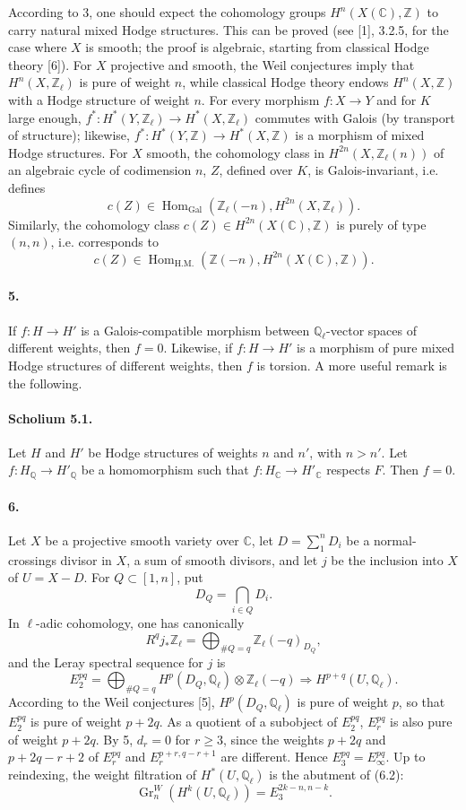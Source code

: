\documentclass[10pt]{article}
\newcommand{\C}{\mathbb C}
\newcommand{\Q}{\mathbb Q}
\newcommand{\Z}{\mathbb Z}
\newcommand{\Ql}{\mathbb Q_\ell}
\newcommand{\Zl}{\mathbb Z_\ell}
\newcommand{\Gr}{\operatorname{Gr}}
\newcommand{\Gal}{\operatorname{Gal}}
\newcommand{\Hom}{\operatorname{Hom}}
\begin{document}
According to 3, one should expect the cohomology groups $H^n(X(\C),\Z)$ to carry natural mixed Hodge structures. This can be proved (see [1], 3.2.5, for the case where $X$ is smooth; the proof is algebraic, starting from classical Hodge theory [6]). For $X$ projective and smooth, the Weil conjectures imply that $H^n(X,\Zl)$ is pure of weight $n$, while classical Hodge theory endows $H^n(X,\Z)$ with a Hodge structure of weight $n$. For every morphism $f:X\to Y$ and for $K$ large enough, $f^*:H^*(Y,\Zl)\to H^*(X,\Zl)$ commutes with Galois (by transport of structure); likewise, $f^*:H^*(Y,\Z)\to H^*(X,\Z)$ is a morphism of mixed Hodge structures. For $X$ smooth, the cohomology class in $H^{2n}(X,\Zl(n))$ of an algebraic cycle of codimension $n$, $Z$, defined over $K$, is Galois-invariant, i.e. defines
\[
c(Z)\in\Hom_{\Gal}(\Zl(-n),H^{2n}(X,\Zl)).
\]
Similarly, the cohomology class $c(Z)\in H^{2n}(X(\C),\Z)$ is purely of type $(n,n)$, i.e. corresponds to
\[
c(Z)\in\Hom_{\mathrm{H.M.}}(\Z(-n),H^{2n}(X(\C),\Z)).
\]

\paragraph{5.} If $f:H\to H'$ is a Galois-compatible morphism between $\Ql$-vector spaces of different weights, then $f=0$. Likewise, if $f:H\to H'$ is a morphism of pure mixed Hodge structures of different weights, then $f$ is torsion. A more useful remark is the following.

\paragraph{Scholium 5.1.} Let $H$ and $H'$ be Hodge structures of weights $n$ and $n'$, with $n>n'$. Let $f:H_\Q\to H'_\Q$ be a homomorphism such that $f:H_\C\to H'_\C$ respects $F$. Then $f=0$.

\paragraph{6.} Let $X$ be a projective smooth variety over $\C$, let $D=\sum_1^nD_i$ be a normal-crossings divisor in $X$, a sum of smooth divisors, and let $j$ be the inclusion into $X$ of $U=X-D$. For $Q\subset[1,n]$, put
\[
D_Q=\bigcap_{i\in Q}D_i.
\]
In $\ell$-adic cohomology, one has canonically
\[
\tag{6.1}
R^qj_*\Zl=\bigoplus_{\#Q=q}\Zl(-q)_{D_Q},
\]
and the Leray spectral sequence for $j$ is
\[
\tag{6.2}
E_2^{pq}=\bigoplus_{\#Q=q}H^p(D_Q,\Ql)\otimes\Zl(-q)\Rightarrow H^{p+q}(U,\Ql).
\]
According to the Weil conjectures [5], $H^p(D_Q,\Ql)$ is pure of weight $p$, so that $E_2^{pq}$ is pure of weight $p+2q$. As a quotient of a subobject of $E_2^{pq}$, $E_r^{pq}$ is also pure of weight $p+2q$. By 5, $d_r=0$ for $r\ge3$, since the weights $p+2q$ and $p+2q-r+2$ of $E_r^{pq}$ and $E_r^{p+r,q-r+1}$ are different. Hence $E_3^{pq}=E_\infty^{pq}$. Up to reindexing, the weight filtration of $H^*(U,\Ql)$ is the abutment of (6.2):
\[
\tag{6.3}
\Gr_n^W(H^k(U,\Ql))=E_3^{2k-n,n-k}.
\]
\end{document}
